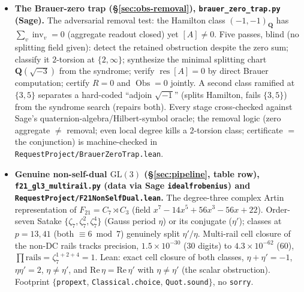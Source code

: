 \documentclass[11pt]{article}
\theoremstyle{definition}
\begin{document}
\begin{itemize}
\item \textbf{The Brauer-zero trap (\S\ref{sec:obs-removal}), \texttt{brauer\_zero\_trap.py} (Sage).} The
adversarial removal test: the Hamilton class $(-1,-1)_{\mathbf Q}$ has $\sum_v\operatorname{inv}_v=0$ (aggregate
readout closed) yet $[A]\neq0$. Five passes, blind (no splitting field given): detect the retained obstruction
despite the zero sum; classify it $2$-torsion at $\{2,\infty\}$; synthesize the minimal splitting chart
$\mathbf Q(\sqrt{-3})$ from the syndrome; verify $\operatorname{res}[A]=0$ by direct Brauer computation; certify
$R{=}0$ and $\operatorname{Obs}{=}0$ jointly. A second class ramified at $\{3,5\}$ separates a hard-coded
``adjoin $\sqrt{-1}$'' (splits Hamilton, fails $\{3,5\}$) from the syndrome search (repairs both). Every stage
cross-checked against Sage's quaternion-algebra/Hilbert-symbol oracle; the removal logic (zero aggregate $\ne$ removal; even local degree kills a $2$-torsion class; certificate $=$ the conjunction) is machine-checked in \texttt{RequestProject/BrauerZeroTrap.lean}.

\item \textbf{Genuine non-self-dual $\mathrm{GL}(3)$ (\S\ref{sec:pipeline}, table row), \texttt{f21\_gl3\_multirail.py} (data via Sage \texttt{idealfrobenius}) and \texttt{RequestProject/F21NonSelfDual.lean}.} The degree-three complex Artin representation of $F_{21}=C_7\rtimes C_3$ (field $x^7-14x^5+56x^3-56x+22$). Order-seven Satake $\{\zeta_7,\zeta_7^2,\zeta_7^4\}$ (Gauss period $\eta$) or its conjugate ($\eta'$); classes at $p=13,41$ (both $\equiv6\bmod7$) genuinely split $\eta'/\eta$. Multi-rail cell closure of the non-DC rails tracks precision, $1.5\times10^{-30}$ (30 digits) to $4.3\times10^{-62}$ (60), $\prod\text{rails}=\zeta_7^{1+2+4}=1$. Lean: exact cell closure of both classes, $\eta+\eta'=-1$, $\eta\eta'=2$, $\eta\ne\eta'$, and $\mathrm{Re}\,\eta=\mathrm{Re}\,\eta'$ with $\eta\ne\eta'$ (the scalar obstruction). Footprint $\{$\texttt{propext}, \texttt{Classical.choice}, \texttt{Quot.sound}$\}$, no \texttt{sorry}.


\end{itemize}
\end{document}
